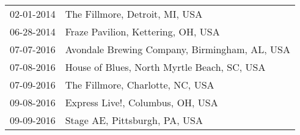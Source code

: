\begin{supertabular}{ll}
 02-01-2014 &                 The Fillmore, Detroit, MI, USA \\
 06-28-2014 &             Fraze Pavilion, Kettering, OH, USA \\
 07-07-2016 &  Avondale Brewing Company, Birmingham, AL, USA \\
 07-08-2016 &    House of Blues, North Myrtle Beach, SC, USA \\
 07-09-2016 &               The Fillmore, Charlotte, NC, USA \\
 09-08-2016 &               Express Live!, Columbus, OH, USA \\
 09-09-2016 &                  Stage AE, Pittsburgh, PA, USA \\
\end{supertabular}
